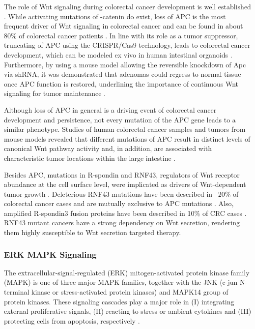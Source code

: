 \begin{flushleft}
The role of Wnt signaling during colorectal cancer development is well established \cite{Polakis2007}. While activating mutations of \textbeta-catenin do exist, loss of APC is the most frequent driver of Wnt signaling in colorectal cancer and can be found in about 80\% of colorectal cancer patients \cite{Fearon1989}. In line with its role as a tumor suppressor, truncating of APC using the CRISPR/Cas9 technology, leads to colorectal cancer development, which can be modeled ex vivo in human intestinal organoids \cite{Matano2015, Drost2015SequentialCells}. Furthermore, by using a mouse model allowing the reversible knockdown of Apc via shRNA, it was demonstrated that adenomas could regress to normal tissue once APC function is restored, underlining the importance of continuous Wnt signaling for tumor maintenance \cite{Dow2015}. \par
Although loss of APC in general is a driving event of colorectal cancer development and persistence, not every mutation of the APC gene leads to a similar phenotype. Studies of human colorectal cancer samples and tumors from mouse models revealed that different mutations of APC result in distinct levels of canonical Wnt pathway activity and, in addition, are associated with characteristic tumor locations within the large intestine \cite{Christie2013, Buchert2010}. \par

Besides APC, mutations in R-spondin and RNF43, regulators of Wnt receptor abundance at the cell surface level, 
were implicated as drivers of Wnt-dependent tumor growth \cite{Lau2014-zg}. Deleterious RNF43 mutations have been described in ~20\% of colorectal cancer cases and are mutually exclusive to APC mutations \cite{Giannakis2014-oq}. Also, amplified R-spondin3 fusion proteins have been described in 10\% of CRC cases \cite{R-spondin3}. RNF43 mutant cancers have a strong dependency on Wnt secretion, rendering them highly susceptible to Wnt secretion targeted therapy.

\subsubsection{ERK MAPK Signaling}

The extracellular-signal-regulated (ERK) mitogen-activated protein kinase family (MAPK) is one of three major MAPK families, together with the JNK (c-jun N-terminal kinase or stress-activated protein kinases) and MAPK14 group of protein kinases. These signaling cascades play a major role in (I) integrating external proliferative signals, (II) reacting to stress or ambient cytokines and (III) protecting cells from apoptosis, respectively \cite{Oncol2005}. 


\end{flushleft}
